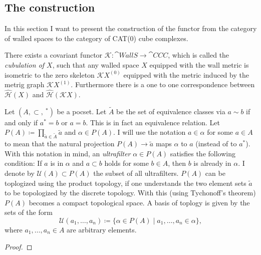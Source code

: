 \subsection{The construction}
\label{sec:construction}

In this section I want to present the construction of the functor from the category of walled spaces to the category of CAT(0) cube complexes.

\begin{thm}
  \label{thn:construction}
  There exists a covariant functor \(\mathcal{K} \colon \cat{WallS} \to \cat{CCC}\), which is called the \emph{cubulation of \(X\)}, such that any walled space \(X\) equipped with the wall metric is isometric to the zero skeleton \(\mathcal{K}X^{(0)}\) equipped with the metric induced by the metrig graph \(\mathcal{K}X^{(1)}\). Furthermore there is a one to one correspondence between \(\mathcal{\hat H}(X)\) and \(\mathcal{\hat H}(\mathcal{K}X)\).
\end{thm}

\begin{defin}[Ultrafilter]
  Let \((A, \subset, \ ^\ast)\) be a pocset. Let \(\tilde A\) be the set of equivalence classes via \(a \sim b\) if and only if \(a^\ast = b\) or \(a = b\). This is in fact an equivalence relation. Let \(P(A) \coloneqq \prod_{\tilde a \in \tilde A} \tilde a\) and \(\alpha \in P(A)\). I will use the notation \(a \in \alpha\) for some \(a \in A\) to mean that the natural projection \(P(A) \to \tilde a\) maps \(\alpha\) to \(a\) (instead of to \(a^\ast\)). With this notation in mind, an \emph{ultrafilter} \(\alpha \in P(A)\) satisfies the following condition: If \(a\) is in \(\alpha\) and \(a \subset b\) holds for some \(b \in A\), then \(b\) is already in \(\alpha\). I denote by \(\mathcal{U}(A) \subset P(A)\) the subset of all ultrafilters. \(P(A)\) can be toplogized using the product topology, if one understands the two element sets \(\tilde a\) to be topologized by the discrete topology. With this (using Tychonoff's theorem) \(P(A)\) becomes a compact topological space. A basis of toplogy is given by the sets of the form
\[
  \mathcal{U}(a_1,\dots, a_n) \coloneqq \{\alpha \in P(A) \mid a_1, \dots, a_n \in \alpha\},
\]
where \(a_1,\dots, a_n \in A\) are arbitrary elements.
\end{defin}

\begin{proof}
  
\end{proof}

